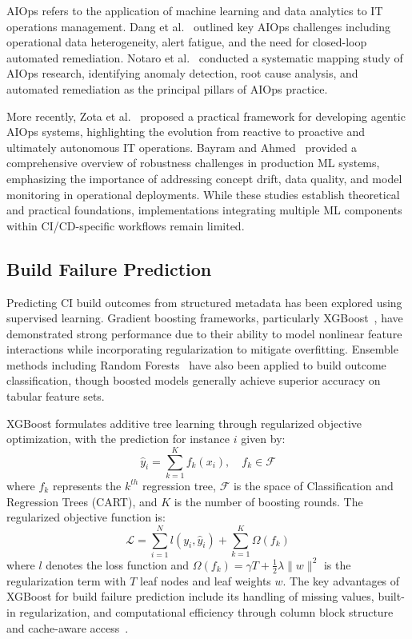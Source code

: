 \documentclass[sn-nature]{sn-jnl}
\theoremstyle{thmstyleone}
\theoremstyle{thmstyletwo}
\theoremstyle{thmstylethree}
\begin{document}
AIOps refers to the application of machine learning and data analytics to IT operations management. Dang et al.~\cite{dang2019aiops} outlined key AIOps challenges including operational data heterogeneity, alert fatigue, and the need for closed-loop automated remediation. Notaro et al.~\cite{notaro2021aiops} conducted a systematic mapping study of AIOps research, identifying anomaly detection, root cause analysis, and automated remediation as the principal pillars of AIOps practice.

More recently, Zota et al.~\cite{zota2025agentic} proposed a practical framework for developing agentic AIOps systems, highlighting the evolution from reactive to proactive and ultimately autonomous IT operations. Bayram and Ahmed~\cite{bayram2025trustworthy} provided a comprehensive overview of robustness challenges in production ML systems, emphasizing the importance of addressing concept drift, data quality, and model monitoring in operational deployments. While these studies establish theoretical and practical foundations, implementations integrating multiple ML components within CI/CD-specific workflows remain limited.

\subsection{Build Failure Prediction}\label{subsec:failure}

Predicting CI build outcomes from structured metadata has been explored using supervised learning. Gradient boosting frameworks, particularly XGBoost~\cite{chen2016xgboost}, have demonstrated strong performance due to their ability to model nonlinear feature interactions while incorporating regularization to mitigate overfitting. Ensemble methods including Random Forests~\cite{breiman2001random} have also been applied to build outcome classification, though boosted models generally achieve superior accuracy on tabular feature sets.

XGBoost formulates additive tree learning through regularized objective optimization, with the prediction for instance $i$ given by:
\begin{equation}
\hat{y}_i = \sum_{k=1}^{K} f_k(x_i), \quad f_k \in \mathcal{F}
\end{equation}
where $f_k$ represents the $k^{th}$ regression tree, $\mathcal{F}$ is the space of Classification and Regression Trees (CART), and $K$ is the number of boosting rounds. The regularized objective function is:
\begin{equation}
\mathcal{L} = \sum_{i=1}^{N} l(y_i, \hat{y}_i) + \sum_{k=1}^{K} \Omega(f_k)
\end{equation}
where $l$ denotes the loss function and $\Omega(f_k) = \gamma T + \frac{1}{2}\lambda\|w\|^2$ is the regularization term with $T$ leaf nodes and leaf weights $w$. The key advantages of XGBoost for build failure prediction include its handling of missing values, built-in regularization, and computational efficiency through column block structure and cache-aware access~\cite{chen2016xgboost}.
\end{document}
